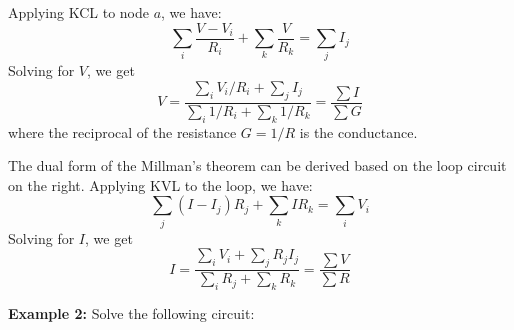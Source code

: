 \documentclass{article}
\begin{document}
\begin{itemize}
  Applying KCL to node $a$, we have:
  \begin{equation} 
    \sum_i \frac{V-V_i}{R_i}+\sum_k \frac{V}{R_k}=\sum_j I_j
  \end{equation}
  Solving for $V$, we get
  \begin{equation} 
    V=\frac{\sum_i V_i/R_i+\sum_j I_j}{\sum_i 1/R_i+\sum_k 1/R_k}=\frac{\sum I}{\sum G} 
  \end{equation}
  where the reciprocal of the resistance $G=1/R$ is the conductance.


  The dual form of the Millman's theorem can be derived based on the
  loop circuit on the right. Applying KVL to the loop, we have:
  \begin{equation} 
    \sum_j (I-I_j)R_j+\sum_k I R_k=\sum_i V_i
  \end{equation}
  Solving for $I$, we get
  \begin{equation} 
    I=\frac{\sum_i V_i+\sum_j R_jI_j}{\sum_i R_j+\sum_k R_k}=\frac{\sum V}{\sum R} 
  \end{equation}

\end{itemize}


{\bf Example 2:} Solve the following circuit:

\end{document}
